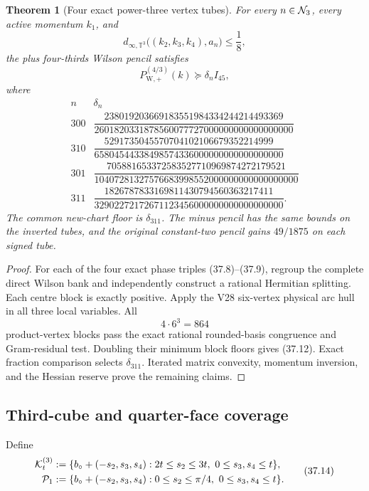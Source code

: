 \documentclass[11pt,oneside]{article}
\newtheorem{theorem}{Theorem}[section]
\theoremstyle{definition}
\theoremstyle{remark}
\begin{document}
\begin{theorem}[Four exact power-three vertex tubes]
\label{thm:newv37-four-charts}
For every \(n\in{\cal N}_3\), every active momentum \(k_1\), and
\[
 d_{\infty,\mathbb T^3}
 \bigl((k_2,k_3,k_4),a_n\bigr)\le\frac18,              \tag{37.10}
\]
the plus four-thirds Wilson pencil satisfies
\[
 P_{\mathrm W,+}^{(4/3)}(k)\succeq\delta_nI_{45},     \tag{37.11}
\]
where
\[
\begin{array}{c|c}
n&\delta_n\\ \hline
300&
\dfrac{238019203669183551984334244214493369}
{2601820331878560077727000000000000000000}\\[6pt]
310&
\dfrac{5291735045570704102106679352214999}
{65804544338498574336000000000000000000}\\[6pt]
301&
\dfrac{705881653372583527710969874272179521}
{10407281327576683998552000000000000000000}\\[6pt]
311&
\dfrac{1826787833169811430794560363217411}
{32902272172671123456000000000000000000}.
\end{array}                                            \tag{37.12}
\]
The common new-chart floor is \(\delta_{311}\).  The minus pencil
has the same bounds on the inverted tubes, and the original
constant-two pencil gains \(49/1875\) on each signed tube.
\end{theorem}

\begin{proof}
For each of the four exact phase triples (37.8)--(37.9), regroup the
complete direct Wilson bank and independently construct a rational
Hermitian splitting.  Each centre block is exactly positive.
Apply the V28 six-vertex physical arc hull in all three local
variables.  All
\[
 4\cdot6^3=864                                         \tag{37.13}
\]
product-vertex blocks pass the exact rational rounded-basis
congruence and Gram-residual test.  Doubling their minimum block
floors gives (37.12).  Exact fraction comparison selects
\(\delta_{311}\).  Iterated matrix convexity, momentum inversion,
and the Hessian reserve prove the remaining claims.
\end{proof}

\subsection{Third-cube and quarter-face coverage}

Define
\[
\begin{split}
 {\cal K}^{(3)}_t
 &:=
 \{b_\circ+(-s_2,s_3,s_4):
       2t\le s_2\le3t,\ 0\le s_3,s_4\le t\},\\
 {\cal P}_{1}
 &:=
 \{b_\circ+(-s_2,s_3,s_4):
       0\le s_2\le\pi/4,\ 0\le s_3,s_4\le t\}.
\end{split}                                            \tag{37.14}
\]
\end{document}
